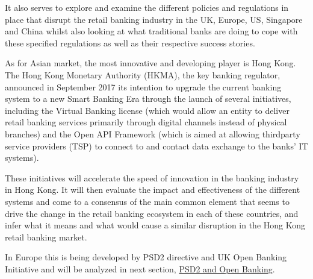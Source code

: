 It also serves to explore and examine the different policies and regulations in place that disrupt the retail banking industry in the UK, Europe, US, Singapore and China whilst also looking at what traditional banks are doing to cope 
with these specified regulations as well as their respective success stories. 

As for Asian market, the most innovative and developing player is Hong Kong.
The Hong Kong Monetary Authority (HKMA), the key banking regulator, announced in September 2017 its intention to upgrade the current banking system to a new Smart Banking Era through the launch of several initiatives, including the Virtual Banking license (which would allow an entity to deliver retail banking services 
primarily through digital channels instead of physical branches)
and the Open API Framework (which is aimed at allowing thirdparty service providers (TSP) to connect to and contact data exchange to the banks’ IT systems).

These initiatives will accelerate the speed of innovation in the banking industry in Hong Kong. 
It will then evaluate the impact and effectiveness of the different systems 
and come to a consensus of the main common element that seems 
to drive the change in the retail banking ecosystem in each of these countries, 
and infer what it means and what would cause a similar disruption in the Hong Kong retail banking market.
\cite{wavestone_virtual_banking}

In Europe this is being developed by PSD2 directive and UK Open Banking Initiative and will be analyzed in next section, \hyperref[sec:psd2]{PSD2 and Open Banking}.
